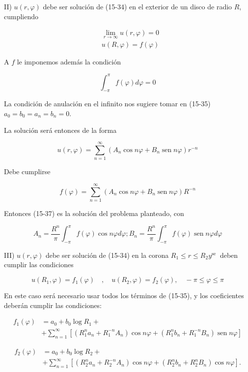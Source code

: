 \documentclass[10pt]{article}
\theoremstyle{plain}
\theoremstyle{definition}
\theoremstyle{remark}
\begin{document}
II) $u(r, \varphi)$ debe ser solución de (15-34) en el exterior de un disco de radio $R$, cumpliendo

$$
\begin{aligned}
& \lim _{r \rightarrow \infty} u(r, \varphi)=0 \\
& u(R, \varphi)=f(\varphi)
\end{aligned}
$$

A $f$ le imponemos además la condición

$$
\int_{-\pi}^{\pi} f(\varphi) d \varphi=0
$$

La condición de anulación en el infinito nos sugiere tomar en (15-35) $a_{0}=b_{0}=a_{n}=b_{n}=0$.

La solución será entonces de la forma


\begin{equation*}
u(r, \varphi)=\sum_{n=1}^{\infty}\left(A_{n} \cos n \varphi+B_{n} \operatorname{sen} n \varphi\right) r^{-n} \tag{15-37}
\end{equation*}


Debe cumplirse

$$
f(\varphi)=\sum_{n=1}^{\infty}\left(A_{n} \cos n \varphi+B_{n} \operatorname{sen} n \varphi\right) R^{-n}
$$

Entonces (15-37) es la solución del problema planteado, con

$$
A_{n}=\frac{R^{n}}{\pi} \int_{-\pi}^{\pi} f(\varphi) \cos n \varphi d \varphi ; B_{n}=\frac{R^{n}}{\pi} \int_{-\pi}^{\pi} f(\varphi) \operatorname{sen} n \varphi d \varphi
$$

III) $u(r, \varphi)$ debe ser solución de (15-34) en la corona $R_{1} \leqslant r \leqslant R_{2} y^{\text {se }}$ deben cumplir las condiciones

$$
u\left(R_{1}, \varphi\right)=f_{1}(\varphi) \quad, \quad u\left(R_{2}, \varphi\right)=f_{2}(\varphi), \quad-\pi \leqslant \varphi \leqslant \pi
$$

En este caso será necesario usar todos los términos de (15-35), y los coeficientes deberán cumplir las condiciones:

$$
\begin{aligned}
f_{1}(\varphi) & =a_{0}+b_{0} \log R_{1}+ \\
& +\sum_{n=1}^{\infty}\left[\left(R_{1}^{n} a_{n}+R_{1}^{-n} A_{n}\right) \cos n \varphi+\left(R_{1}^{n} b_{n}+R_{1}^{-n} B_{n}\right) \operatorname{sen} n \varphi\right]
\end{aligned}
$$

$$
\begin{aligned}
f_{2}(\varphi) & =a_{0}+b_{0} \log R_{2}+ \\
& +\sum_{n=1}^{\infty}\left[\left(R_{2}^{n} a_{n}+R_{2}^{-n} A_{n}\right) \cos n \varphi+\left(R_{2}^{n} b_{n}+R_{2}^{n} B_{n}\right) \cos n \varphi\right] .
\end{aligned}
$$
\end{document}
